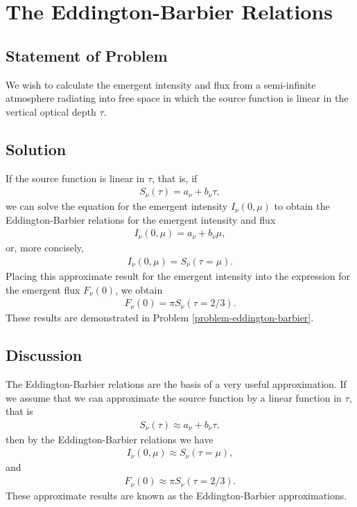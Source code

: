 \newslide

\section{The Eddington-Barbier Relations}
\label{section:eddington-barbier-relations}

\subsection{Statement of Problem}

We wish to calculate the emergent intensity and flux from a semi-infinite atmosphere radiating into free space in which the source function is linear in the vertical optical depth $\tau$.

\subsection{Solution}

If the source function is linear in $\tau$, that is,
if
\begin{align}
S_\nu(\tau) = a_\nu + b_\nu \tau,
\end{align}
we can solve the equation for the emergent intensity
$I_\nu(0,\mu)$ to obtain the Eddington-Barbier relations for
the emergent intensity and flux
\begin{align}
I_\nu(0,\mu) = a_\nu + b_\nu \mu,
\end{align}
or, more concisely,
\begin{align}
I_\nu(0,\mu) = S_\nu(\tau = \mu).
\end{align}
Placing this approximate result for the emergent intensity
into the expression for the emergent flux $F_\nu(0)$, we
obtain
\begin{align}
F_\nu(0) = \pi S_\nu(\tau = 2/3).
\end{align}
These results are demonstrated in Problem
\ref{problem-eddington-barbier}.

\newslide

\subsection{Discussion}

The Eddington-Barbier relations are the basis of a very
useful approximation. If we assume that we can approximate
the source function by a linear function in $\tau$, that
is
\begin{align}
S_\nu(\tau) \approx a_\nu + b_\nu \tau,
\end{align}
then by the Eddington-Barbier relations we have
\begin{align}
I_\nu(0,\mu) \approx S_\nu(\tau = \mu),
\end{align}
and
\begin{align}
F_\nu(0) \approx \pi S_\nu(\tau = 2/3).
\end{align}
These approximate results are known as the Eddington-Barbier
approximations.

